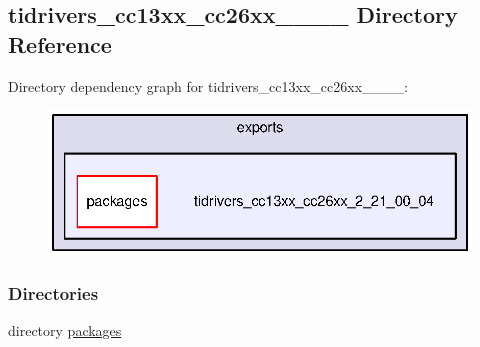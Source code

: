 \subsection{tidrivers\+\_\+cc13xx\+\_\+cc26xx\+\_\+\_\+\_\+\_ Directory Reference}
\label{dir_ffec4c53c499197dc1aac9a345d4fe6c}
Directory dependency graph for tidrivers\+\_\+cc13xx\+\_\+cc26xx\+\_\+\_\+\_\+\_\+:
\nopagebreak
\begin{figure}[H]
\begin{center}
\leavevmode
\includegraphics[width=345pt]{dir_ffec4c53c499197dc1aac9a345d4fe6c_dep}
\end{center}
\end{figure}
\subsubsection*{Directories}
\begin{DoxyCompactItemize}
\item 
directory \hyperlink{dir_e878ca508aca5c2adbeed7fe0aa36dc1}{packages}
\end{DoxyCompactItemize}
